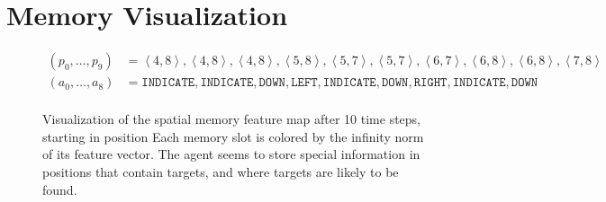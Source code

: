 \chapter{Memory Visualization}
\label{app:memory}

\begin{figure}
    \centering
    

    \begin{align*}
        \left(p_0, \dots, p_9 \right) &= \left\langle 4, 8 \right\rangle, \left\langle 4, 8 \right\rangle, \left\langle 4, 8 \right\rangle, \left\langle 5, 8 \right\rangle, \left\langle 5, 7 \right\rangle, \left\langle 5, 7 \right\rangle, \left\langle 6, 7 \right\rangle, \left\langle 6, 8 \right\rangle, \left\langle 6, 8 \right\rangle, \left\langle 7, 8 \right\rangle\\
        \left(a_0, \dots, a_8 \right) &= \mathtt{INDICATE}, \mathtt{INDICATE}, \mathtt{DOWN}, \mathtt{LEFT}, \mathtt{INDICATE}, \mathtt{DOWN}, \mathtt{RIGHT}, \mathtt{INDICATE}, \mathtt{DOWN}\\
    \end{align*}

    \caption[Spatial memory visualization]{Visualization of the spatial memory feature map after 10 time steps, starting in position Each memory slot is colored by the infinity norm of its feature vector. The agent seems to store special information in positions that contain targets, and where targets are likely to be found.}
    \label{fig:memory}
\end{figure}    
